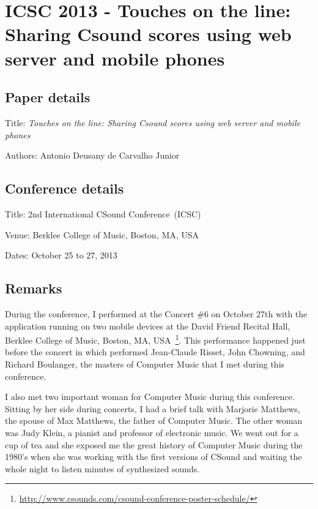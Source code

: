 \section{ICSC 2013 - Touches on the line: Sharing Csound scores using web server and mobile phones}
\label{ape:papericsc2013}

\subsection*{Paper details}

Title: \textit{Touches on the line: Sharing Csound scores using web server and mobile phones}

Authors: Antonio Deusany de Carvalho Junior

\subsection*{Conference details}

Title: 2nd International CSound Conference~(ICSC)

Venue: Berklee College of Music, Boston, MA, USA

Dates: October 25 to 27, 2013

\subsection*{Remarks}

During the conference, I performed at the Concert \#6 on October 27th with the application running on two mobile devices at the David Friend Recital Hall, Berklee College of Music, Boston, MA, USA~\footnote{\url{http://www.csounds.com/csound-conference-poster-schedule/}}.
This performance happened just before the concert in which performed Jean-Claude Risset, John Chowning, and Richard Boulanger, the masters of Computer Music that I met during this conference.

I also met two important woman for Computer Music during this conference.
Sitting by her side during concerts, I had a brief talk with Marjorie Matthews, the spouse of Max Matthews, the father of Computer Music.
The other woman was Judy Klein, a pianist and professor of electronic music.
We went out for a cup of tea and she exposed me the great history of Computer Music during the 1980's when she was working with the first versions of CSound and waiting the whole night to listen minutes of synthesized sounds.

